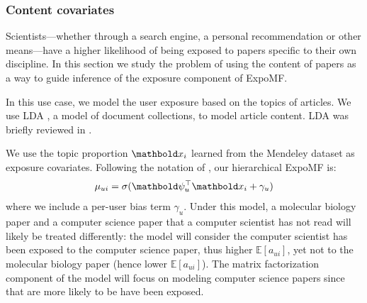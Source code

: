 


\subsubsection{Content covariates}\label{chpt:expomf:sec:si_doc}

Scientists---whether through a search engine, a personal recommendation
or other means---have a higher likelihood of being exposed to papers
specific to their own discipline. In this section we study the problem of
using the content of papers as a way to guide inference of the exposure
component of ExpoMF.


In this use case, we model the user exposure based on the topics of
articles. We use \gls{LDA} \citep{blei2003latent},
a model of document collections, to model article content. \gls{LDA} was briefly reviewed in .   

We use the topic proportion $\mbx_i$ learned from the Mendeley dataset as
exposure covariates. Following the notation of , our
hierarchical ExpoMF is:
\begin{displaymath} \mu_{ui}= \sigma(\mb\psi_u^\top \mbx_i + \gamma_u)\end{displaymath}
where we include a per-user bias term $\gamma_u$. Under this model, a
molecular biology paper and a computer science paper that a computer
scientist has not read will likely be treated differently: the model will
consider the computer scientist has been exposed to the computer science
paper, thus higher $\mathbb{E}[a_{ui}]$, yet not to the molecular biology
paper (hence lower $\mathbb{E}[a_{ui}]$). The matrix factorization
component of the model will focus on modeling computer science papers
since that are more likely to be have been exposed. 

